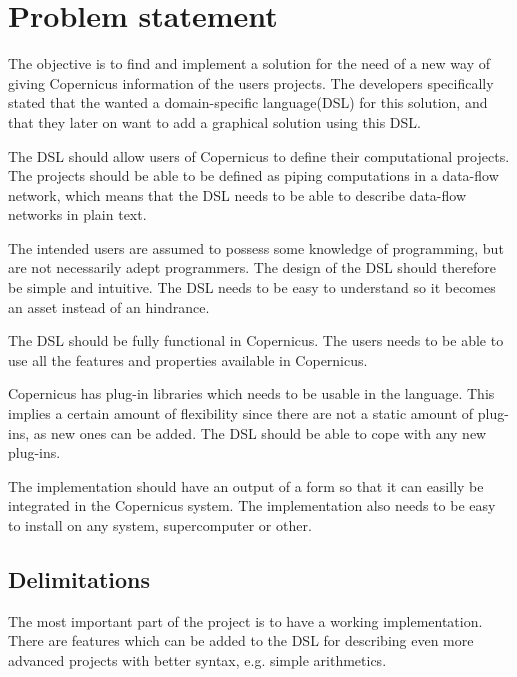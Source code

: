 


\section{Problem statement}
The objective is to find and implement a solution for the need of a
new way of giving Copernicus information of the users projects. The
developers specifically stated that the wanted a domain-specific
language(DSL) for this solution, and that they later on want to add a
graphical solution using this DSL.

The DSL should allow users of Copernicus to define their computational
projects. The projects should be able to be defined as piping
computations in a data-flow network, which means that the DSL needs to
be able to describe data-flow networks in plain text.

The intended users are assumed to possess some knowledge of
programming, but are not necessarily adept programmers. The design of
the DSL should therefore be simple and intuitive. The DSL needs to be
easy to understand so it becomes an asset instead of an hindrance.

The DSL should be fully functional in Copernicus. The users needs to
be able to use all the features and properties available in
Copernicus.

Copernicus has plug-in libraries which needs to be usable in the
language. This implies a certain amount of flexibility since there are
not a static amount of plug-ins, as new ones can be added. The DSL
should be able to cope with any new plug-ins.

The implementation should have an output of a form so that it can
easilly be integrated in the Copernicus system. The implementation
also needs to be easy to install on any system, supercomputer or
other.

\subsection{Delimitations}
The most important part of the project is to have a working
implementation. There are features which can be added to the DSL for
describing even more advanced projects with better syntax, e.g. simple
arithmetics.

